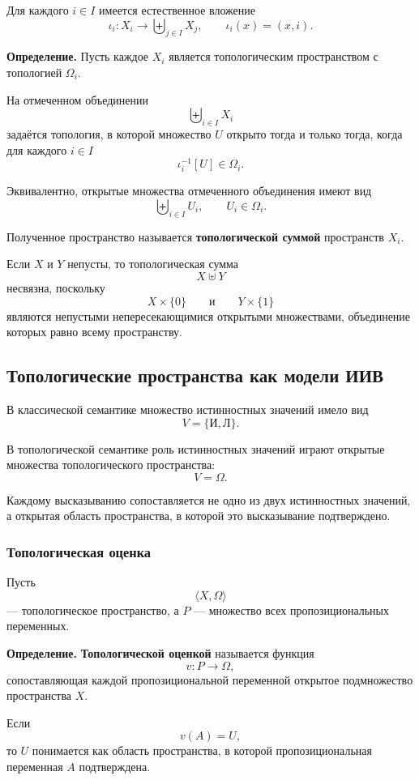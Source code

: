 \documentclass[12pt,a4paper,oneside,openany]{book}
\theoremstyle{definition}
\theoremstyle{plain}
\theoremstyle{remark}
\begin{document}
Для каждого \(i\in I\) имеется естественное вложение
\[
\iota_i:X_i\to\biguplus_{j\in I}X_j,
\qquad
\iota_i(x)=(x,i).
\]

\textbf{Определение.}
Пусть каждое \(X_i\) является топологическим пространством с
топологией \(\Omega_i\).

На отмеченном объединении
\[
\biguplus_{i\in I}X_i
\]
задаётся топология, в которой множество \(U\) открыто тогда и только
тогда, когда для каждого \(i\in I\)
\[
\iota_i^{-1}[U]\in\Omega_i.
\]

Эквивалентно, открытые множества отмеченного объединения имеют вид
\[
\biguplus_{i\in I}U_i,
\qquad
U_i\in\Omega_i.
\]

Полученное пространство называется
\textbf{топологической суммой} пространств \(X_i\).

Если \(X\) и \(Y\) непусты, то топологическая сумма
\[
X\uplus Y
\]
несвязна, поскольку
\[
X\times\{0\}
\qquad\text{и}\qquad
Y\times\{1\}
\]
являются непустыми непересекающимися открытыми множествами, объединение
которых равно всему пространству.

\subsection{Топологические пространства как модели ИИВ}

В классической семантике множество истинностных значений имело вид
\[
V=\{\text{И},\text{Л}\}.
\]

В топологической семантике роль истинностных значений играют
открытые множества топологического пространства:
\[
V=\Omega.
\]

Каждому высказыванию сопоставляется не одно из двух истинностных
значений, а открытая область пространства, в которой это высказывание
подтверждено.

\subsubsection{Топологическая оценка}

Пусть
\[
\langle X,\Omega\rangle
\]
--- топологическое пространство, а \(P\) --- множество всех
пропозициональных переменных.

\textbf{Определение.}
\textbf{Топологической оценкой} называется функция
\[
v:P\to\Omega,
\]
сопоставляющая каждой пропозициональной переменной открытое
подмножество пространства \(X\).

Если
\[
v(A)=U,
\]
то \(U\) понимается как область пространства, в которой
пропозициональная переменная \(A\) подтверждена.
\end{document}
